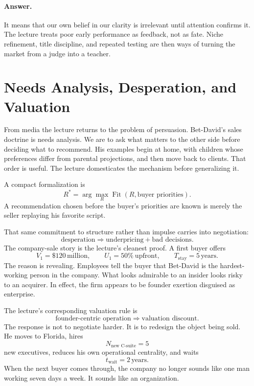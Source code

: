 \paragraph{Answer.} It means that our own belief in our clarity is irrelevant until attention confirms it. The lecture treats poor early performance as feedback, not as fate. Niche refinement, title discipline, and repeated testing are then ways of turning the market from a judge into a teacher.

\section{Needs Analysis, Desperation, and Valuation}

From media the lecture returns to the problem of persuasion. Bet-David's sales doctrine is needs analysis. We are to ask what matters to the other side before deciding what to recommend. His examples begin at home, with children whose preferences differ from parental projections, and then move back to clients. That order is useful. The lecture domesticates the mechanism before generalizing it.

A compact formalization is
\begin{equation}
R^*=\arg\max_R \operatorname{Fit}(R,\text{buyer priorities}).
\end{equation}
A recommendation chosen before the buyer's priorities are known is merely the seller replaying his favorite script.

That same commitment to structure rather than impulse carries into negotiation:
\begin{equation}
\text{desperation}\Rightarrow \text{underpricing}+\text{bad decisions}.
\end{equation}
The company-sale story is the lecture's cleanest proof. A first buyer offers
\begin{equation}
V_1=\$120\,\text{million},\qquad
U_1=50\%\ \text{upfront},\qquad
T_{\text{stay}}=5\,\text{years}.
\end{equation}
The reason is revealing. Employees tell the buyer that Bet-David is the hardest-working person in the company. What looks admirable to an insider looks risky to an acquirer. In effect, the firm appears to be founder exertion disguised as enterprise.

The lecture's corresponding valuation rule is
\begin{equation}
\text{founder-centric operation}\Rightarrow \text{valuation discount}.
\end{equation}
The response is not to negotiate harder. It is to redesign the object being sold. He moves to Florida, hires
\begin{equation}
N_{\text{new C-suite}}=5
\end{equation}
new executives, reduces his own operational centrality, and waits
\begin{equation}
t_{\text{wait}}=2\,\text{years}.
\end{equation}
When the next buyer comes through, the company no longer sounds like one man working seven days a week. It sounds like an organization.


